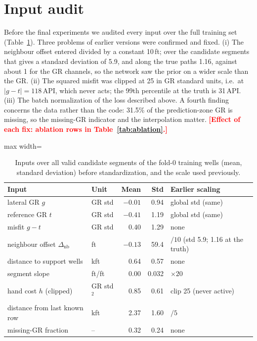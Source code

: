 \documentclass[preprint,12pt,authoryear]{elsarticle}
\newcommand{\PH}[1]{\textcolor{red}{\textbf{[#1]}}}
\begin{document}
\section{Input audit}\label{sec:audit}
Before the final experiments we audited every input over the full training set (Table~\ref{tab:audit}). Three problems of earlier versions were confirmed and fixed. (i) The neighbour offset entered divided by a constant 10\,ft; over the candidate segments that gives a standard deviation of 5.9, and along the true paths 1.16, against about 1 for the GR channels, so the network saw the prior on a wider scale than the GR. (ii) The squared misfit was clipped at 25 in GR standard units, i.e.\ at $|g-t|=118$\,API, which never acts; the 99th percentile at the truth is 31\,API. (iii) The batch normalization of the loss described above. A fourth finding concerns the data rather than the code: 31.5\% of the prediction-zone GR is missing, so the missing-GR indicator and the interpolation matter. \PH{Effect of each fix: ablation rows in Table~\ref{tab:ablation}.}

\begin{table}[!htbp]\centering\small
\caption{Inputs over all valid candidate segments of the fold-0 training wells (mean, standard deviation) before standardization, and the scale used previously.}\label{tab:audit}
\begin{adjustbox}{max width=\linewidth}
\begin{tabular}{llrrl}
\toprule
Input & Unit & Mean & Std & Earlier scaling \\
\midrule
lateral GR $g$ & GR std & $-0.01$ & 0.94 & global std (same) \\
reference GR $t$ & GR std & $-0.41$ & 1.19 & global std (same) \\
misfit $g-t$ & GR std & 0.40 & 1.29 & none \\
neighbour offset $\Delta_{\mathrm{nb}}$ & ft & $-0.13$ & 59.4 & $/10$ (std 5.9; 1.16 at the truth) \\
distance to support wells & kft & 0.64 & 0.57 & none \\
segment slope & ft/ft & 0.00 & 0.032 & $\times20$ \\
hand cost $h$ (clipped) & GR std$^2$ & 0.85 & 0.61 & clip 25 (never active) \\
distance from last known row & kft & 2.37 & 1.60 & $/5$ \\
missing-GR fraction & -- & 0.32 & 0.24 & none \\
\bottomrule
\end{tabular}
\end{adjustbox}
\end{table}
\end{document}
